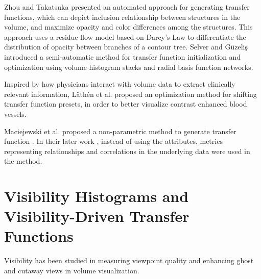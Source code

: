 Zhou and Takatsuka \cite{zhou_automatic_2009} presented an automated approach for generating transfer functions, which can depict inclusion relationship between structures in the volume, and maximize opacity and color differences among the structures. This approach uses a residue flow model based on Darcy\rq s Law to differentiate the distribution of opacity between branches of a contour tree.
Selver and G{\"u}zeli{\c s} \cite{alper_selver_semiautomatic_2009} introduced a semi-automatic method for transfer function initialization and optimization using volume histogram stacks and radial basis function networks.

Inspired by how physicians interact with volume data to extract clinically relevant information, L{\"a}th{\'e}n et al. \cite{lathen_automatic_2012} proposed an optimization method for shifting transfer function presets, in order to better visualize contrast enhanced blood vessels.


Maciejewski et al. proposed a non-parametric method to generate transfer function \cite{maciejewski_structuring_2009}.
In their later work \cite{maciejewski_abstracting_2013}, instead of using the attributes, metrics representing relationships and correlations in the underlying data were used in the method.


\section{Visibility Histograms and Visibility-Driven Transfer Functions}
Visibility has been studied in measuring viewpoint quality \cite{bordoloi_view_2005} and enhancing ghost and cutaway views \cite{viola_importance-driven_2004} in volume visualization.

